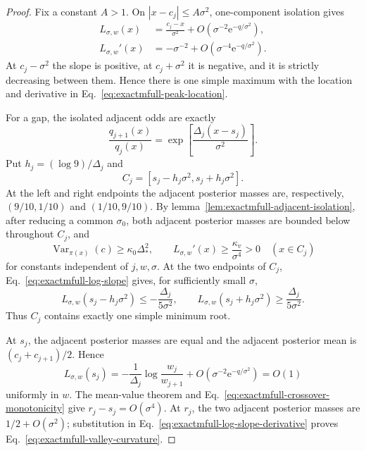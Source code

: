 \documentclass{iopjournal}
\newcommand{\e}{\mathrm e}
\theoremstyle{plain}
\theoremstyle{definition}
\begin{document}
\begin{proof}
Fix a constant \(A>1\).  On
\(|x-c_j|\le A\sigma^2\), one-component isolation gives
\begin{align}
 L_{\sigma,w}(x)
 &=\frac{c_j-x}{\sigma^2}
   +O(\sigma^{-2}\e^{-q/\sigma^2}),
 \label{eq:exactmfull-peak-slope-expansion}\\
 L_{\sigma,w}'(x)
 &=-\sigma^{-2}
   +O(\sigma^{-4}\e^{-q/\sigma^2}).
 \label{eq:exactmfull-peak-derivative-expansion}
\end{align}
At \(c_j-\sigma^2\) the slope is positive, at
\(c_j+\sigma^2\) it is negative, and it is strictly decreasing between
them.  Hence there is one simple maximum with the location and derivative in
Eq.~\eqref{eq:exactmfull-peak-location}.

For a gap, the isolated adjacent odds are exactly
\begin{equation}
 \frac{q_{j+1}(x)}{q_j(x)}
 =\exp\!\left[\frac{\Delta_j(x-s_j)}{\sigma^2}\right].
 \label{eq:exactmfull-adjacent-odds}
\end{equation}
Put \(h_j=(\log9)/\Delta_j\) and
\begin{equation}
 C_j=[s_j-h_j\sigma^2,s_j+h_j\sigma^2].
 \label{eq:exactmfull-crossover-interval}
\end{equation}
At the left and right endpoints the adjacent posterior masses are,
respectively, \((9/10,1/10)\) and \((1/10,9/10)\).  By
lemma~\ref{lem:exactmfull-adjacent-isolation}, after reducing a common
\(\sigma_0\), both adjacent posterior masses are bounded below throughout
\(C_j\), and
\begin{equation}
 \operatorname{Var}_{\pi(x)}(c)\ge\kappa_0\Delta_*^2,
 \qquad
 L_{\sigma,w}'(x)\ge\frac{\kappa_v}{\sigma^4}>0
 \quad(x\in C_j)
 \label{eq:exactmfull-crossover-monotonicity}
\end{equation}
for constants independent of \(j,w,\sigma\).  At the two endpoints of
\(C_j\), Eq.~\eqref{eq:exactmfull-log-slope} gives, for sufficiently small
\(\sigma\),
\begin{equation}
 L_{\sigma,w}(s_j-h_j\sigma^2)
 \le-\frac{\Delta_j}{5\sigma^2},
 \qquad
 L_{\sigma,w}(s_j+h_j\sigma^2)
 \ge \frac{\Delta_j}{5\sigma^2}.
 \label{eq:exactmfull-crossover-signs}
\end{equation}
Thus \(C_j\) contains exactly one simple minimum root.

At \(s_j\), the adjacent posterior masses are equal and the adjacent
posterior mean is \((c_j+c_{j+1})/2\).  Hence
\begin{equation}
 L_{\sigma,w}(s_j)
 =-\frac{1}{\Delta_j}\log\frac{w_j}{w_{j+1}}
 +O(\sigma^{-2}\e^{-q/\sigma^2})=O(1)
 \label{eq:exactmfull-slope-at-crossover}
\end{equation}
uniformly in \(w\).  The mean-value theorem and
Eq.~\eqref{eq:exactmfull-crossover-monotonicity} give
\(r_j-s_j=O(\sigma^4)\).  At \(r_j\), the two adjacent posterior masses are
\(1/2+O(\sigma^2)\); substitution in
Eq.~\eqref{eq:exactmfull-log-slope-derivative} proves
Eq.~\eqref{eq:exactmfull-valley-curvature}.


\end{proof}
\end{document}
